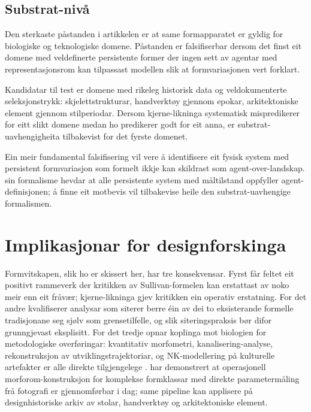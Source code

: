 \documentclass[10pt,a4paper,twocolumn]{article}
\begin{document}
\subsection{Substrat-nivå}

Den sterkaste påstanden i artikkelen er at same formapparatet er gyldig for biologiske og teknologiske domene. Påstanden er falsifiserbar dersom det finst eit domene med veldefinerte persistente former der ingen sett av agentar med representasjonsrom kan tilpassast modellen slik at formvariasjonen vert forklart.

Kandidatar til test er domene med rikeleg historisk data og veldokumenterte seleksjonstrykk: skjelettstrukturar, handverktøy gjennom epokar, arkitektoniske element gjennom stilperiodar. Dersom kjerne-likninga systematisk mispredikerer for eitt slikt domene medan ho predikerer godt for eit anna, er substrat-uavhengigheita tilbakevist for det fyrste domenet.

Ein meir fundamental falsifisering vil vere å identifisere eit fysisk system med persistent formvariasjon som formelt ikkje kan skildrast som agent-over-landskap. \citet{fieldslevin2022} sin formalisme hevdar at alle persistente system med måltilstand oppfyller agent-definisjonen; å finne eit motbevis vil tilbakevise heile den substrat-uavhengige formalismen.

\section{Implikasjonar for designforskinga}

Formvitskapen, slik ho er skissert her, har tre konsekvensar. Fyrst får feltet eit positivt rammeverk der kritikken av Sullivan-formelen kan erstattast av noko meir enn eit fråvær; kjerne-likninga gjev kritikken ein operativ erstatning. For det andre kvalifiserer analysar som siterer berre éin av dei to eksisterande formelle tradisjonane seg sjølv som grensetilfelle, og slik siteringspraksis bør difor grunngjevast eksplisitt. For det tredje opnar koplinga mot biologien for metodologiske overføringar: kvantitativ morfometri, kanalisering-analyse, rekonstruksjon av utviklingstrajektoriar, og NK-modellering på kulturelle artefakter er alle direkte tilgjengelege \citep{wright1932, lande1979, arnold2001, wagner2005, mcghee2007, polly2016}. \citet{contrerasfigueroa2023} har demonstrert at operasjonell morforom-konstruksjon for komplekse formklassar med direkte parametermåling frå fotografi er gjennomførbar i dag; same pipeline kan applisere på designhistoriske arkiv av stolar, handverktøy og arkitektoniske element.
\end{document}
